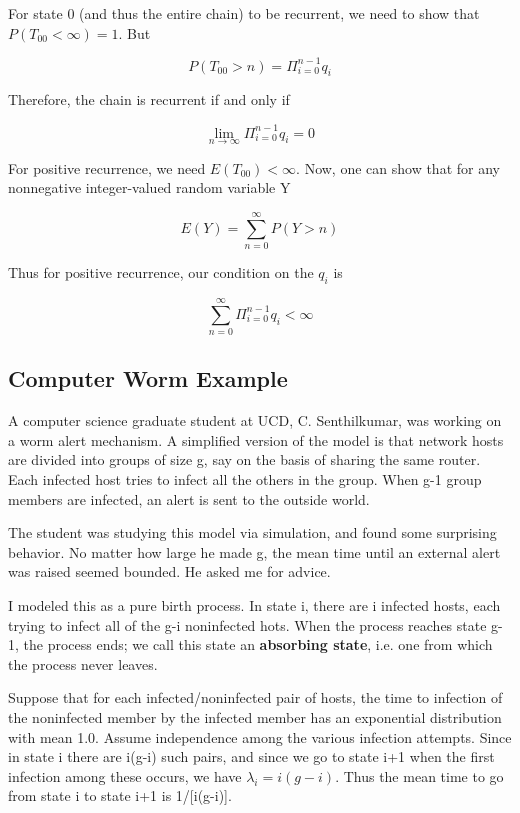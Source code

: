 \documentclass[11pt]{article}
\begin{document}
For state 0 (and thus the entire chain) to be recurrent, we need to show
that $P(T_{00}<\infty )=1$. But

\begin{equation}
P(T_{00}>n)=\Pi_{i=0}^{n-1}q_{i}
\end{equation}

Therefore, the chain is recurrent if and only if 

\begin{equation}
\lim_{n\rightarrow \infty }\Pi_{i=0}^{n-1}q_{i}=0
\end{equation}

For positive recurrence, we need $E(T_{00})<\infty$. Now, one can show
that for any nonnegative integer-valued random variable Y

\begin{equation}
E(Y)=\sum ^{\infty }_{n=0}P(Y>n)
\end{equation}

Thus for positive recurrence, our condition on the $q_i$ is

\begin{equation}
\sum ^{\infty }_{n=0}\Pi ^{n-1}_{i=0}q_{i}<\infty 
\end{equation} 

\subsection{Computer Worm Example}

A computer science graduate student at UCD, C. Senthilkumar, was working
on a worm alert mechanism.  A simplified version of the model is that
network hosts are divided into groups of size g, say on the basis of
sharing the same router.  Each infected host tries to infect all the
others in the group.  When g-1 group members are infected, an alert is
sent to the outside world.

The student was studying this model via simulation, and found some
surprising behavior.  No matter how large he made g, the mean time until
an external alert was raised seemed bounded.  He asked me for advice.

I modeled this as a pure birth process.  In state i, there are i
infected hosts, each trying to infect all of the g-i noninfected hots.
When the process reaches state g-1, the process ends; we call this state
an {\bf absorbing state}, i.e. one from which the process never leaves.

Suppose that for each infected/noninfected pair of hosts, the time to
infection of the noninfected member by the infected member has an
exponential distribution with mean 1.0.  Assume independence among the
various infection attempts.  Since in state i there are i(g-i) such
pairs, and since we go to state i+1 when the first infection among these
occurs, we have $\lambda_i = i(g-i)$.  Thus the mean time to go from
state i to state i+1 is 1/[i(g-i)].  
\end{document}
